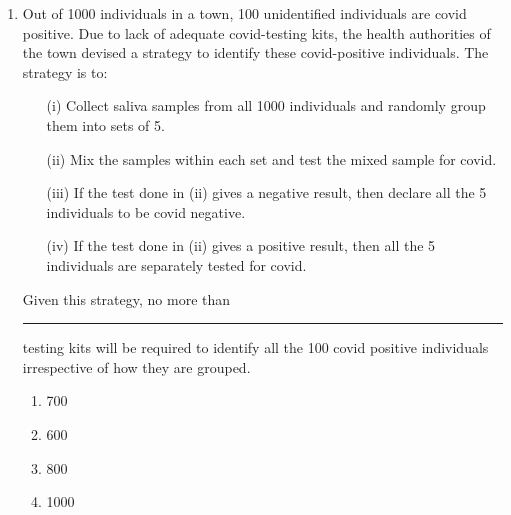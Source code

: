 \documentclass[journal,12pt,onecolumn]{IEEEtran}
\theoremstyle{remark}
\begin{document}
\begin{enumerate}
\begin{quote}
\hfill{\textit{[Excerpt from The Truth about Stories by T. King]}}
\end{quote}

\hfill{}

\begin{multicols}{2}
\begin{enumerate}
\item It is a child's description of what he or she likes.
\item It is an adult's memory of what he or she liked as a child.
\item The child in the passage read stories about imaginary travel only in parts.
\item It teaches us that stories are good for children.
\end{enumerate}
\end{multicols}


\newpage

\item Out of 1000 individuals in a town, 100 unidentified individuals are covid positive. Due to lack of adequate covid-testing kits, the health authorities of the town devised a strategy to identify these covid-positive individuals. The strategy is to:
\begin{itemize}
    \item[(i)] Collect saliva samples from all 1000 individuals and randomly group them into sets of 5.
    \item[(ii)] Mix the samples within each set and test the mixed sample for covid.
    \item[(iii)] If the test done in (ii) gives a negative result, then declare all the 5 individuals to be covid negative.
    \item[(iv)] If the test done in (ii) gives a positive result, then all the 5 individuals are separately tested for covid.
\end{itemize}

Given this strategy, no more than \rule{1cm}{0.15mm} testing kits will be required to identify all the 100 covid positive individuals irrespective of how they are grouped. \hfill{}

\begin{multicols}{2}
\begin{enumerate}
\item 700
\item 600
\item 800
\item 1000
\end{enumerate}
\end{multicols}


\end{enumerate}
\end{document}
